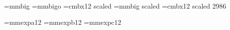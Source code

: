 


\font\bigmmf=mmbig              		%
\font\bigmmof=mmbigo					%
\font\bigrm=cmbx12 scaled 
\font\hugemmf=mmbig scaled  	%
\font\hugerm=cmbx12 scaled 2986 %

\def\bigmmr{\let\mmcurf=\bigmmf\let\mmcursf=\mmsf\let\mmcurrm=\bigrm
  \mmcbls=28pt\ifmmmode\setmm\fi}
\def\bigmmo{\let\mmcurf=\bigmmof\let\mmcursf=\mmsf\let\mmcurrm=\bigrm
  \mmcbls=28pt\ifmmmode\setmm\fi}
\def\hugemmr{\let\mmcurf=\hugemmf\let\mmcursf=\mmsf\let\mmcurrm=\hugerm
  \mmcbls=48pt\ifmmmode\setmm\fi}


\font\mmxa=mmexpa12				%
\font\mmxb=mmexpb12				%
\font\mmxc=mmexpc12				%

\def\xamm{\let\mmcurf=\mmxa\let\mmcursf=\mmsf\let\mmcurrm=\twelverm
  \mmcbls=15.6pt\ifmmmode\setmm\fi}
\def\xbmm{\let\mmcurf=\mmxb\let\mmcursf=\mmsf\let\mmcurrm=\twelverm
  \mmcbls=15.6pt\ifmmmode\setmm\fi}
\def\xcmm{\let\mmcurf=\mmxc\let\mmcursf=\mmsf\let\mmcurrm=\twelverm
  \mmcbls=15.6pt\ifmmmode\setmm\fi}

